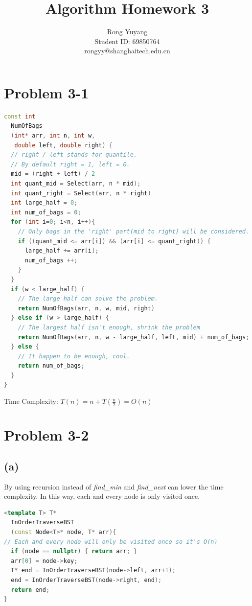 \documentclass{article}
\title{Algorithm Homework 3}
\author{Rong Yuyang \\ Student ID: 69850764 \\ rongyy@shanghaitech.edu.cn}
\begin{document}
\maketitle

\section*{Problem 3-1}
\begin{lstlisting}[language = C++]
const int 
  NumOfBags
  (int* arr, int n, int w, 
   double left, double right) {
  // right / left stands for quantile.
  // By default right = 1, left = 0.
  mid = (right + left) / 2
  int quant_mid = Select(arr, n * mid);
  int quant_right = Select(arr, n * right)
  int large_half = 0;
  int num_of_bags = 0;
  for (int i=0; i<n, i++){
    // Only bags in the 'right' part(mid to right) will be considered.
    if ((quant_mid <= arr[i]) && (arr[i] <= quant_right)) {
      large_half += arr[i];
      num_of_bags ++;
    }
  }
  if (w < large_half) {
    // The large half can solve the problem.
    return NumOfBags(arr, n, w, mid, right)
  } else if (w > large_half) {
    // The largest half isn't enough, shrink the problem
    return NumOfBags(arr, n, w - large_half, left, mid) + num_of_bags;
  } else {
    // It happen to be enough, cool.
    return num_of_bags;
  }
}
\end{lstlisting}  
Time Complexity: $T(n) = n + T(\frac{n}{2}) = O(n)$
\section*{Problem 3-2}
  \subsection*{(a)}
  By using recursion instead of \textit{find\_min} and \textit{find\_next} can lower the time complexity. In this way, each and every node is only visited once.
\begin{lstlisting}[language = C++]
<template T> T*
  InOrderTraverseBST
  (const Node<T>* node, T* arr){
// Each and every node will only be visited once so it's O(n)
  if (node == nullptr) { return arr; }
  arr[0] = node->key;
  T* end = InOrderTraverseBST(node->left, arr+1);
  end = InOrderTraverseBST(node->right, end);
  return end;
}
\end{lstlisting}   
\end{document}
